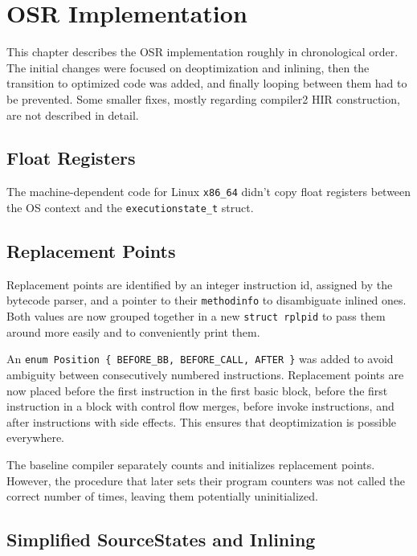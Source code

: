 \documentclass[draft,final]{vutinfth} %
\begin{document}
    \chapter{OSR Implementation}

    This chapter describes the OSR implementation
    roughly in chronological order.
    The initial changes were focused on deoptimization and inlining,
    then the transition to optimized code was added,
    and finally looping between them had to be prevented.
    Some smaller fixes,
    mostly regarding compiler2 HIR construction,
    are not described in detail.


    \section{Float Registers}

    The machine-dependent code for Linux \texttt{x86\_64} didn't copy float registers between the OS context
    and the \lstinline{executionstate_t} struct.


    \section{Replacement Points}

    Replacement points are identified by an integer instruction id, assigned by the bytecode parser,
    and a pointer to their \lstinline{methodinfo} to disambiguate inlined ones.
    Both values are now grouped together in a new \lstinline{struct rplpid}
    to pass them around more easily and to conveniently print them.

    An \lstinline|enum Position { BEFORE_BB, BEFORE_CALL, AFTER }|
    was added
    to avoid ambiguity between consecutively numbered instructions.
    Replacement points are now placed
    before the first instruction in the first basic block,
    before the first instruction in a block with control flow merges,
    before invoke instructions,
    and after instructions with side effects.
    This ensures that deoptimization is possible everywhere.

    The baseline compiler separately counts and initializes replacement points.
    However, the procedure that later sets their program counters was not called the correct number of times,
    leaving them potentially uninitialized.


    \section{Simplified SourceStates and Inlining}
\end{document}
